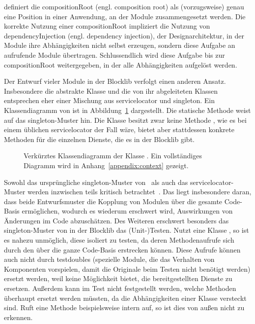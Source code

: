 \textcite[S.~76]{Seemann2012} definiert die \gls{compositionRoot} (engl. composition root) als (vorzugsweise) genau eine Position in einer Anwendung, an der Module zusammengesetzt werden. Die korrekte Nutzung einer \gls{compositionRoot} impliziert die Nutzung von \gls{dependencyInjection} (engl. dependency injection), der Designarchitektur, in der Module ihre Abhängigkeiten nicht selbst erzeugen, sondern diese Aufgabe an aufrufende Module übertragen. Schlussendlich wird diese Aufgabe bis zur \gls{compositionRoot} weitergegeben, in der alle Abhängigkeiten aufgelöst werden. 


Der Entwurf vieler Module in der Blocklib verfolgt einen anderen Ansatz. Insbesondere die abstrakte Klasse \classContext{} und die von ihr abgeleiteten Klassen entsprechen eher einer Mischung aus \gls{servicelocator} und \gls{singleton}. Ein Klassendiagramm von \classContext{} ist in Abbildung~\ref{fig:diagContext} dargestellt. Die statische Methode  weist auf das \gls{singleton}-Muster hin. Die Klasse besitzt zwar keine Methode , wie es bei einem üblichen \gls{servicelocator} der Fall wäre, bietet aber stattdessen konkrete Methoden für die einzelnen Dienste, die es in der Blocklib gibt.

\begin{figure}
  \begin{center}
    
  \end{center}
  \caption[Verkürztes Klassendiagramm der Klasse \classContext{}.]{Verkürztes Klassendiagramm der Klasse \classContext{}. Ein vollständiges Diagramm wird in Anhang~\vref{appendix:context} gezeigt.}\label{fig:diagContext}
\end{figure}

Sowohl das ursprüngliche \gls{singleton}-Muster von~\textcite[S.~127~\psqq]{Gamma2016} als auch das \gls{servicelocator}-Muster werden inzwischen teils kritisch betrachtet~\cites[S.~103~\psqq]{Nystrom2015}[S.~154~\psqq]{Seemann2012}. Das liegt insbesondere daran, dass beide Entwurfsmuster die Kopplung von Modulen über die gesamte Code-Basis ermöglichen, wodurch es wiederum erschwert wird, Auswirkungen von Änderungen im Code abzuschätzen. Des Weiteren erschwert besonders das \gls{singleton}-Muster von \classContext{} in der Blocklib das (Unit-)Testen. Nutzt eine Klasse \classContext{}, so ist es nahezu unmöglich, diese isoliert zu testen, da deren Methodenaufrufe sich durch den \classContext{} über die ganze Code-Basis erstrecken können. Diese  Aufrufe können auch nicht durch \glspl{testdouble} (spezielle Module, die das Verhalten von Komponenten vorspielen, damit die Originale beim Testen nicht benötigt werden) ersetzt werden, weil \classContext{} keine Möglichkeit bietet, die bereitgestellten Dienste zu ersetzen. Außerdem kann im Test nicht festgestellt werden, welche Methoden überhaupt ersetzt werden müssten, da die Abhängigkeiten einer Klasse versteckt sind. Ruft eine Methode beispielsweise intern  auf, so ist dies von außen nicht zu erkennen.

